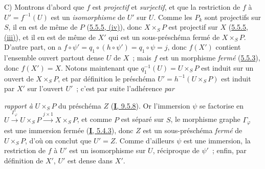 C) Montrons d'abord que $f$ est \emph{projectif} et \emph{surjectif}, et que la restriction
de $f$ à $U'=f^{-1}(U)$ est un \emph{isomorphisme} de $U'$ sur $U$. Comme les $P_k$
sont projectifs sur $S$, il en est de même de $P$
(\hyperref[II.5.5.5-fr]{5.5.5, (iv)}), donc $X\times_SP$ est projectif sur
$X$ (\hyperref[II.5.5.5-fr]{5.5.5, (iii)}), et il en est de même de $X'$ qui
est un sous-préschéma fermé de $X\times_SP$. D'autre part, on a
$f\circ\psi'=q_1\circ(h\circ\psi')=q_1\circ\psi=j$, donc $f(X')$ contient
l'ensemble ouvert partout dense $U$ de $X$~; mais $f$ est un morphisme \emph{fermé}
(\hyperref[II.5.5.3-fr]{5.5.3}), donc $f(X')=X$. Notons maintenant que
$q_1^{-1}(U)=U\times_SP$ est induit sur un ouvert de $X\times_SP$, et par
définition le préschéma $U'=h^{-1}(U\times_SP)$ est induit par $X'$ sur
l'ouvert $U'$~; c'est par suite l'adhérence \emph{par}


\emph{rapport à} $U\times_SP$ du préschéma $Z$
(\hyperref[I.9.5.8-fr]{\textbf{I}, 9.5.8}). Or l'immersion $\psi$ se factorise en
$U\xrightarrow{\Gamma_\varphi}U\times_SP\xrightarrow{j\times1}X\times_SP$,
et comme $P$ est séparé sur $S$, le morphisme graphe $\Gamma_\varphi$ est une
immersion fermée (\hyperref[I.5.4.3-fr]{\textbf{I}, 5.4.3}), donc $Z$ est un
sous-préschéma \emph{fermé} de $U\times_SP$, d'où on conclut que $U'=Z$. Comme
d'ailleurs $\psi$ est une immersion, la restriction de $f$ à $U'$ est un
isomorphisme sur $U$, réciproque de $\psi'$~; enfin, par définition de $X'$,
$U'$ est dense dans $X'$.


